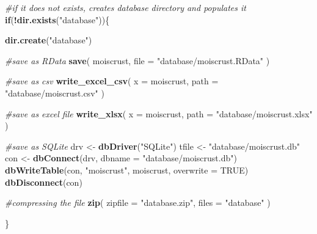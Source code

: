 \documentclass[]{article}
\newenvironment{Shaded}{\begin{snugshade}}{\end{snugshade}}
\newcommand{\CommentTok}[1]{\textcolor[rgb]{0.56,0.35,0.01}{\textit{#1}}}
\newcommand{\ControlFlowTok}[1]{\textcolor[rgb]{0.13,0.29,0.53}{\textbf{#1}}}
\newcommand{\DataTypeTok}[1]{\textcolor[rgb]{0.13,0.29,0.53}{#1}}
\newcommand{\KeywordTok}[1]{\textcolor[rgb]{0.13,0.29,0.53}{\textbf{#1}}}
\newcommand{\NormalTok}[1]{#1}
\newcommand{\OperatorTok}[1]{\textcolor[rgb]{0.81,0.36,0.00}{\textbf{#1}}}
\newcommand{\OtherTok}[1]{\textcolor[rgb]{0.56,0.35,0.01}{#1}}
\newcommand{\StringTok}[1]{\textcolor[rgb]{0.31,0.60,0.02}{#1}}
\begin{document}
\begin{Shaded}
\begin{Highlighting}[]
\CommentTok{#if it does not exists, creates database directory and populates it}
\ControlFlowTok{if}\NormalTok{(}\OperatorTok{!}\KeywordTok{dir.exists}\NormalTok{(}\StringTok{"database"}\NormalTok{))\{}
  
  \KeywordTok{dir.create}\NormalTok{(}\StringTok{"database"}\NormalTok{)}
  
  \CommentTok{#save as RData}
  \KeywordTok{save}\NormalTok{(}
\NormalTok{    moiscrust, }
    \DataTypeTok{file =} \StringTok{"database/moiscrust.RData"}
\NormalTok{  )}
  
  \CommentTok{#save as csv}
  \KeywordTok{write_excel_csv}\NormalTok{(}
    \DataTypeTok{x =}\NormalTok{ moiscrust,}
    \DataTypeTok{path =} \StringTok{"database/moiscrust.csv"}
\NormalTok{  )}
  
  \CommentTok{#save as excel file}
  \KeywordTok{write_xlsx}\NormalTok{(}
    \DataTypeTok{x =}\NormalTok{ moiscrust,}
    \DataTypeTok{path =} \StringTok{"database/moiscrust.xlsx"}
\NormalTok{  )}
  
  \CommentTok{#save as SQLite}
\NormalTok{  drv <-}\StringTok{ }\KeywordTok{dbDriver}\NormalTok{(}\StringTok{"SQLite"}\NormalTok{)}
\NormalTok{  tfile <-}\StringTok{ "database/moiscrust.db"}
\NormalTok{  con <-}\StringTok{ }\KeywordTok{dbConnect}\NormalTok{(drv, }\DataTypeTok{dbname =} \StringTok{"database/moiscrust.db"}\NormalTok{)}
  \KeywordTok{dbWriteTable}\NormalTok{(con, }\StringTok{"moiscrust"}\NormalTok{, moiscrust, }\DataTypeTok{overwrite =} \OtherTok{TRUE}\NormalTok{)}
  \KeywordTok{dbDisconnect}\NormalTok{(con)}
  
  \CommentTok{#compressing the file}
  \KeywordTok{zip}\NormalTok{(}
    \DataTypeTok{zipfile =} \StringTok{"database.zip"}\NormalTok{,}
    \DataTypeTok{files =} \StringTok{"database"}
\NormalTok{  )}
  
\NormalTok{\}}
\end{Highlighting}
\end{Shaded}
\end{document}
